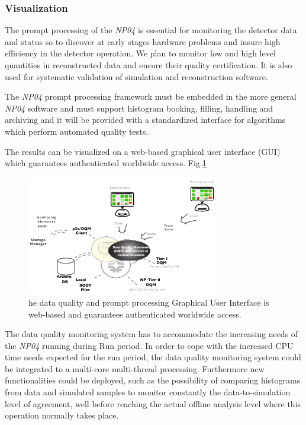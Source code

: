 \documentclass[pdftex,12pt,letter]{article}
\newcommand{\expname}{\textit{NP04}\xspace}
\begin{document}
\subsubsection{Visualization}
\label{sec:viz_intro}

The prompt processing of the \expname is essential for monitoring the detector data and status so to discover at early stages hardware problems and insure high efficiency in the detector operation. We plan to monitor low and high level quantities in reconstructed data and ensure their quality certification. It is also used for systematic validation of simulation and reconstruction software. 

The \expname prompt processing framework must be embedded in the more general \expname software and must support histogram booking, filling, handling and archiving and it will be provided with a standardized interface for algorithms which perform automated quality tests. 

The results can be visualized on a web-based graphical user interface (GUI) which guarantees authenticated worldwide access.
Fig.\ref{fig:p3sgui} 

\begin{figure}[tbh]
  \centering
  \includegraphics[width=0.75\textwidth]{figures/p3s_dqm_gui_np04.pdf}
  \caption{he data quality and prompt processing Graphical User Interface is web-based and guarantees authenticated worldwide access.}
  \label{fig:p3sgui}
\end{figure}

The data quality monitoring system has to accommodate the increasing needs of the \expname running during Run period. In order to cope with the increased CPU time needs expected for the run period, the data quality monitoring system could be integrated to a multi-core multi-thread processing. Furthermore new functionalities could be deployed, such as the possibility of comparing histograms from data and simulated samples to monitor constantly the data-to-simulation level of agreement, well before reaching the actual offline analysis level where this operation normally takes place.
\end{document}
